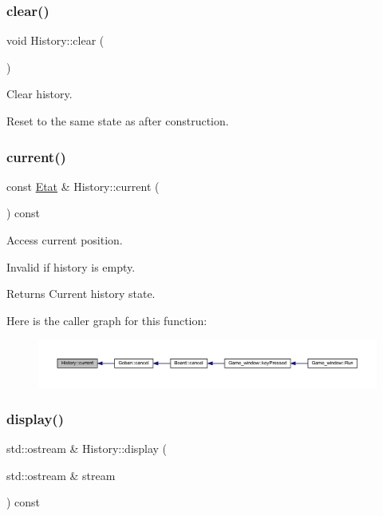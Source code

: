 \subsubsection{\texorpdfstring{clear()}{clear()}}
{\footnotesize\ttfamily void History\+::clear (\begin{DoxyParamCaption}{ }\end{DoxyParamCaption})}



Clear history. 

Reset to the same state as after construction. \mbox{\label{class_history_a0ca66ba5a026689877e027754fc5bd52}} 
\subsubsection{\texorpdfstring{current()}{current()}}
{\footnotesize\ttfamily const \hyperlink{class_etat}{Etat} \& History\+::current (\begin{DoxyParamCaption}{ }\end{DoxyParamCaption}) const}



Access current position. 

Invalid if history is empty.

\begin{DoxyReturn}{Returns}
Current history state. 
\end{DoxyReturn}
Here is the caller graph for this function\+:
\nopagebreak
\begin{figure}[H]
\begin{center}
\leavevmode
\includegraphics[width=350pt]{class_history_a0ca66ba5a026689877e027754fc5bd52_icgraph}
\end{center}
\end{figure}
\mbox{\label{class_history_a5c1724d84912d1571d2475b2fb703081}} 
\subsubsection{\texorpdfstring{display()}{display()}}
{\footnotesize\ttfamily std\+::ostream \& History\+::display (\begin{DoxyParamCaption}\item[{std\+::ostream \&}]{stream }\end{DoxyParamCaption}) const}



